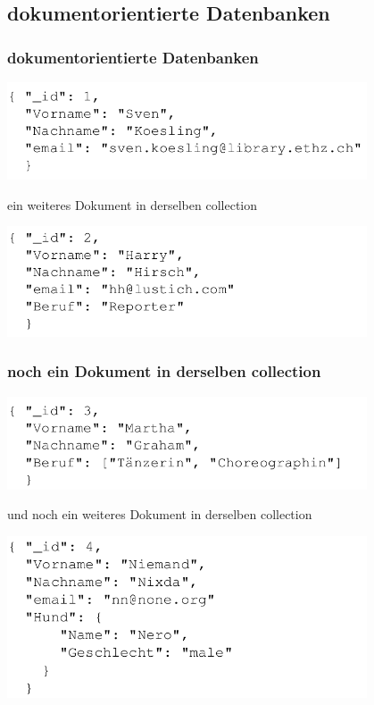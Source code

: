 \subsection{dokumentorientierte Datenbanken}
\begin{frame}
  \frametitle<beamer>{dokumentorientierte Datenbanken}
  \begin{center}
    \includegraphics[width=0.8\textwidth]{pics/doc1}
  \end{center}
\end{frame}

\begin{frame}{ein weiteres Dokument in derselben collection}
  \begin{center}
  \includegraphics[width=0.8\textwidth]{pics/doc2}
  \end{center}
\end{frame}
     
\begin{frame}
  \frametitle{noch ein Dokument in derselben collection}
  \begin{center}
  \includegraphics[width=0.8\textwidth]{pics/doc3}
  \end{center}
\end{frame}

\begin{frame}{und noch ein weiteres Dokument in derselben collection}
  \begin{center}
    \includegraphics[width=0.8\textwidth]{pics/doc4}
  \end{center}
\end{frame}

